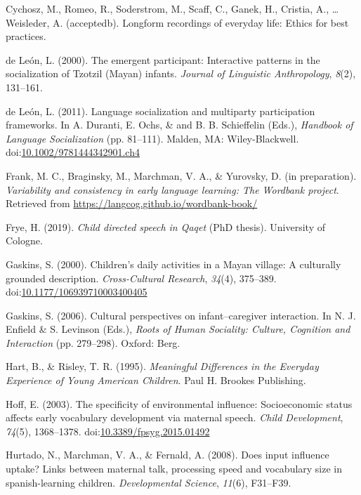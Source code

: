 \documentclass[,man,floatsintext]{apa6}
\begin{document}
\hypertarget{ref-cychoszURlongform}{}
Cychosz, M., Romeo, R., Soderstrom, M., Scaff, C., Ganek, H., Cristia,
A., \ldots{} Weisleder, A. (acceptedb). Longform recordings of everyday
life: Ethics for best practices.

\hypertarget{ref-deleon2000emergent}{}
de León, L. (2000). The emergent participant: Interactive patterns in
the socialization of Tzotzil (Mayan) infants. \emph{Journal of
Linguistic Anthropology}, \emph{8}(2), 131--161.

\hypertarget{ref-deleon2011language}{}
de León, L. (2011). Language socialization and multiparty participation
frameworks. In A. Duranti, E. Ochs, \& and B. B. Schieffelin (Eds.),
\emph{Handbook of Language Socialization} (pp. 81--111). Malden, MA:
Wiley-Blackwell.
doi:\href{https://doi.org/10.1002/9781444342901.ch4}{10.1002/9781444342901.ch4}

\hypertarget{ref-frankIPvariability}{}
Frank, M. C., Braginsky, M., Marchman, V. A., \& Yurovsky, D. (in
preparation). \emph{Variability and consistency in early language
learning: The Wordbank project}. Retrieved from
\url{https://langcog.github.io/wordbank-book/}

\hypertarget{ref-frye2019thesis}{}
Frye, H. (2019). \emph{Child directed speech in Qaqet} (PhD thesis).
University of Cologne.

\hypertarget{ref-gaskins2000childrens}{}
Gaskins, S. (2000). Children's daily activities in a Mayan village: A
culturally grounded description. \emph{Cross-Cultural Research},
\emph{34}(4), 375--389.
doi:\href{https://doi.org/10.1177/106939710003400405}{10.1177/106939710003400405}

\hypertarget{ref-gaskins2006cultural}{}
Gaskins, S. (2006). Cultural perspectives on infant--caregiver
interaction. In N. J. Enfield \& S. Levinson (Eds.), \emph{Roots of
Human Sociality: Culture, Cognition and Interaction} (pp. 279--298).
Oxford: Berg.

\hypertarget{ref-hart1995meaningful}{}
Hart, B., \& Risley, T. R. (1995). \emph{Meaningful Differences in the
Everyday Experience of Young American Children}. Paul H. Brookes
Publishing.

\hypertarget{ref-hoff2003specificity}{}
Hoff, E. (2003). The specificity of environmental influence:
Socioeconomic status affects early vocabulary development via maternal
speech. \emph{Child Development}, \emph{74}(5), 1368--1378.
doi:\href{https://doi.org/10.3389/fpsyg.2015.01492}{10.3389/fpsyg.2015.01492}

\hypertarget{ref-hurtado2008does}{}
Hurtado, N., Marchman, V. A., \& Fernald, A. (2008). Does input
influence uptake? Links between maternal talk, processing speed and
vocabulary size in spanish-learning children. \emph{Developmental
Science}, \emph{11}(6), F31--F39.
\end{document}
